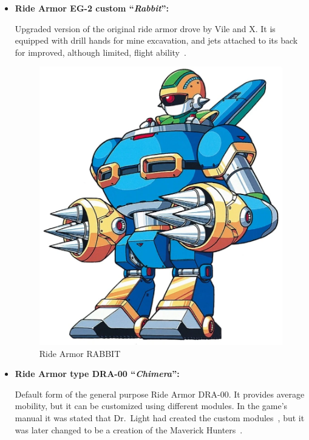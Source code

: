 \begin{itemize}
	\item \hypertarget{vehicle:Ride_Armor_Rabbit}{\textbf{Ride Armor EG-2 custom ``\textit{Rabbit}'':}}
	Upgraded version of the original ride armor drove by Vile and X. It is  equipped with drill hands for mine excavation, and jets attached to its back for improved, although limited, flight ability~\cite{wayback:X2_resources}. 
	\begin{figure}[htp]
		\centering
		\includegraphics[height=\portraitsize]{figures/X2/Enemies/Ride_armor_RABBIT.png}
		\caption{Ride Armor RABBIT}
	\end{figure}
	
	\item \hypertarget{vehicle:Ride_Armor_Chimera}{\textbf{Ride Armor type DRA-00 ``\textit{Chimera}'':}} Default form of the general purpose Ride Armor DRA-00. It provides average mobility, but it can be customized using different modules. In the game's manual it was stated that Dr.~Light had created the custom modules~\cite{X3:Manual}, but it was later changed to be a creation of the Maverick Hunters~\cite{book:Compendium}.
	

\end{itemize}
